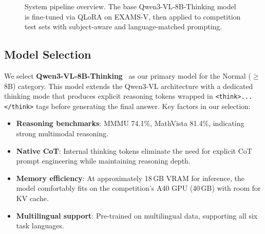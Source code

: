 \documentclass[]{ceurart}
\begin{document}
\begin{figure}[t]
\centering
{}
\caption{System pipeline overview. The base Qwen3-VL-8B-Thinking model is fine-tuned via QLoRA on EXAMS-V, then applied to competition test sets with subject-aware and language-matched prompting.}
\label{fig:pipeline}
\end{figure}

\subsection{Model Selection}
\label{sec:model}

We select \textbf{Qwen3-VL-8B-Thinking}~\cite{qwen3} as our primary model for the Normal ($\geq$8B) category.
This model extends the Qwen3-VL architecture with a dedicated thinking mode that produces explicit reasoning tokens wrapped in \texttt{<think>...</think>} tags before generating the final answer.
Key factors in our selection:

\begin{itemize}
    \item \textbf{Reasoning benchmarks}: MMMU 74.1\%, MathVista 81.4\%, indicating strong multimodal reasoning.
    \item \textbf{Native CoT}: Internal thinking tokens eliminate the need for explicit CoT prompt engineering while maintaining reasoning depth.
    \item \textbf{Memory efficiency}: At approximately 18\,GB VRAM for inference, the model comfortably fits on the competition's A40 GPU (40\,GB) with room for KV cache.
    \item \textbf{Multilingual support}: Pre-trained on multilingual data, supporting all six task languages.
\end{itemize}
\end{document}
